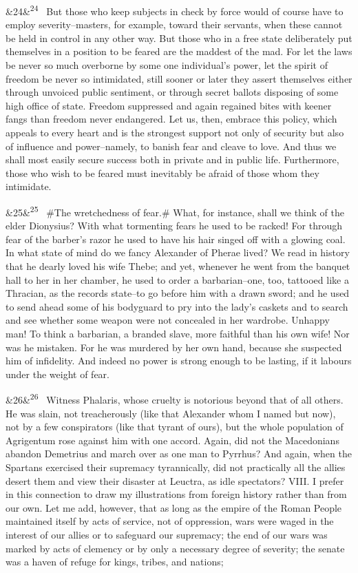 \documentclass[12pt]{article}
\newcommand{\para}[1][]{\par\noindent\ifx&#1&\else\textsuperscript{\footnotesize #1}~\fi}
\begin{document}
\para[24] But those who keep subjects in check by force would of course have to employ severity--masters, for example, toward their servants, when these cannot be held in control in any other way. But those who in a free state deliberately put themselves in a position to be feared are the maddest of the mad. For let the laws be never so much overborne by some one individual's power, let the spirit of freedom be never so intimidated, still sooner or later they assert themselves either through unvoiced public sentiment, or through secret ballots disposing of some high office of state. Freedom suppressed and again regained bites with keener fangs than freedom never endangered. Let us, then, embrace this policy, which appeals to every heart and is the strongest support not only of security but also of influence and power--namely, to banish fear and cleave to love. And thus we shall most easily secure success both in private and in public life. Furthermore, those who wish to be feared must inevitably be afraid of those whom they intimidate.

\para[25] \#The wretchedness of fear.\# What, for instance, shall we think of the elder Dionysius? With what tormenting fears he used to be racked! For through fear of the barber's razor he used to have his hair singed off with a glowing coal. In what state of mind do we fancy Alexander of Pherae lived? We read in history that he dearly loved his wife Thebe; and yet, whenever he went from the banquet hall to her in her chamber, he used to order a barbarian--one, too, tattooed like a Thracian, as the records state--to go before him with a drawn sword; and he used to send ahead some of his bodyguard to pry into the lady's caskets and to search and see whether some weapon were not concealed in her wardrobe. Unhappy man! To think a barbarian, a branded slave, more faithful than his own wife! Nor was he mistaken. For he was murdered by her own hand, because she suspected him of infidelity. And indeed no power is strong enough to be lasting, if it labours under the weight of fear.

\para[26] Witness Phalaris, whose cruelty is notorious beyond that of all others. He was slain, not treacherously (like that Alexander whom I named but now), not by a few conspirators (like that tyrant of ours), but the whole population of Agrigentum rose against him with one accord. Again, did not the Macedonians abandon Demetrius and march over as one man to Pyrrhus? And again, when the Spartans exercised their supremacy tyrannically, did not practically all the allies desert them and view their disaster at Leuctra, as idle spectators? VIII. I prefer in this connection to draw my illustrations from foreign history rather than from our own. Let me add, however, that as long as the empire of the Roman People maintained itself by acts of service, not of oppression, wars were waged in the interest of our allies or to safeguard our supremacy; the end of our wars was marked by acts of clemency or by only a necessary degree of severity; the senate was a haven of refuge for kings, tribes, and nations;
\end{document}
